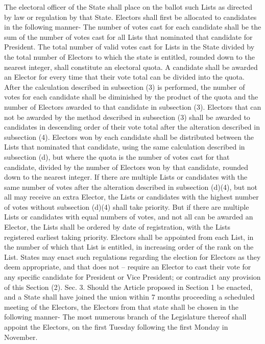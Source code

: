 \documentclass{article}
\begin{document}
    The electoral officer of the State shall place on the ballot such Lists as directed by law or regulation by that State. 
    Electors shall first be allocated to candidates in the following manner-
    The number of votes cast for each candidate shall be the sum of the number of votes cast for all Lists that nominated that candidate for President.
    The total number of valid votes cast for Lists in the State divided by the total number of Electors to which the state is entitled, rounded down to the nearest integer, shall constitute an electoral quota.
    A candidate shall be awarded an Elector for every time that their vote total can be divided into the quota.
    After the calculation described in subsection (3) is performed, the number of votes for each candidate shall be diminished by the product of the quota and the number of Electors awarded to that candidate in subsection (3).
    Electors that can not be awarded by the method described in subsection (3) shall be awarded to candidates in descending order of their vote total after the alteration described in subsection (4).
    Electors won by each candidate shall be distributed between the Lists that nominated that candidate, using the same calculation described in subsection (d), but where the quota is the number of votes cast for that candidate, divided by the number of Electors won by that candidate, rounded down to the nearest integer.
    If there are multiple Lists or candidates with the same number of votes after the alteration described in subsection (d)(4), but not all may receive an extra Elector, the Lists or candidates with the highest number of votes without subsection (d)(4) shall take priority. But if there are multiple Lists or candidates with equal numbers of votes, and not all can be awarded an Elector, the Lists shall be ordered by date of registration, with the Lists registered earliest taking priority. 
    Electors shall be appointed from each List, in the number of which that List is entitled, in increasing order of the rank on the List. 
    States may enact such regulations regarding the election for Electors as they deem appropriate, and that does not  –
    require an Elector to cast their vote for any specific candidate for President or Vice President; or
    contradict any provision of this Section (2).
    Sec. 3. Should the Article proposed in Section 1 be enacted, and a State shall have joined the union within 7 months proceeding a scheduled meeting of the Electors, the Electors from that state shall be chosen in the following manner-
    The most numerous branch of the Legislature thereof shall appoint the Electors, on the first Tuesday following the first Monday in November. 
\end{document}
